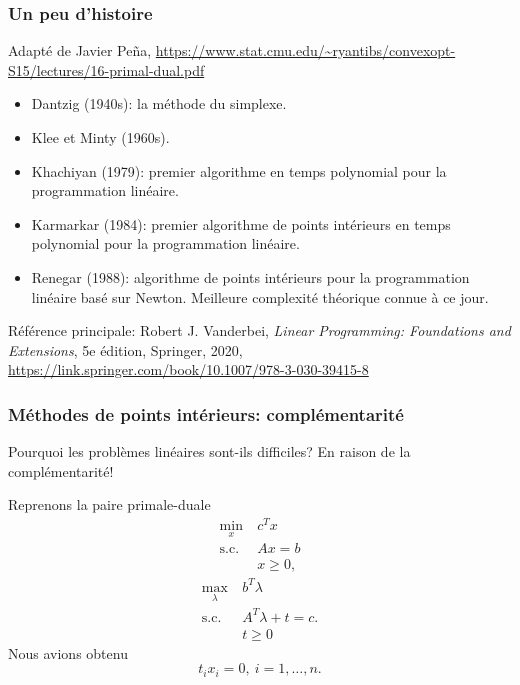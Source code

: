 \documentclass[t, aspectratio=169,usepdftitle=false]{beamer}
\begin{document}
\begin{frame}
\frametitle{Un peu d'histoire}

Adapté de Javier Peña, \url{https://www.stat.cmu.edu/~ryantibs/convexopt-S15/lectures/16-primal-dual.pdf}
\begin{itemize}
\item 
Dantzig (1940s): la méthode du simplexe.
\item
Klee et Minty (1960s).
\item 
Khachiyan (1979): premier algorithme en temps polynomial pour la programmation linéaire.
\item
Karmarkar (1984): premier algorithme de points intérieurs en temps polynomial pour la programmation linéaire.
\item 
Renegar (1988): algorithme de points intérieurs pour la programmation linéaire basé sur Newton. Meilleure complexité théorique connue à ce jour.
\end{itemize}

Référence principale: Robert J. Vanderbei, \textit{Linear
Programming: Foundations and Extensions}, 5e édition, Springer, 2020, \url{https://link.springer.com/book/10.1007/978-3-030-39415-8}

\end{frame}

\begin{frame}
\frametitle{Méthodes de points intérieurs: complémentarité}

Pourquoi les problèmes linéaires sont-ils difficiles? En raison de la complémentarité!

\mbox{}

Reprenons la paire primale-duale
\begin{align*}
\min_x\ & c^T x \\
\mbox{s.c. } & Ax = b \\
& x \geq 0,
\end{align*}
\begin{align*}
\max_{\lambda} \  & b^T \lambda \\
\mbox{s.c. } & A^T \lambda  +t = c. \\
& t \geq 0
\end{align*}
Nous avions obtenu
\[
t_i x_i = 0, \ i = 1,\ldots, n.
\]

\end{frame}
\end{document}
